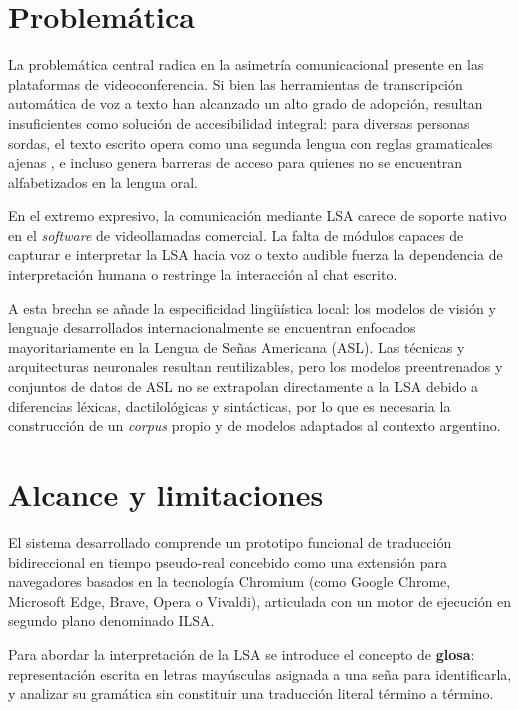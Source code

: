 \section{Problemática}
La problemática central radica en la asimetría comunicacional presente en las plataformas de videoconferencia. Si bien las herramientas de transcripción automática de voz a texto han alcanzado un alto grado de adopción, resultan insuficientes como solución de accesibilidad integral: para diversas personas sordas, el texto escrito opera como una segunda lengua con reglas gramaticales ajenas \parencite{massone2003lengua}, e incluso genera barreras de acceso para quienes no se encuentran alfabetizados en la lengua oral.

En el extremo expresivo, la comunicación mediante LSA carece de soporte nativo en el \textit{software} de videollamadas comercial. La falta de módulos capaces de capturar e interpretar la LSA hacia voz o texto audible fuerza la dependencia de interpretación humana o restringe la interacción al chat escrito.

A esta brecha se añade la especificidad lingüística local: los modelos de visión y lenguaje desarrollados internacionalmente se encuentran enfocados mayoritariamente en la Lengua de Señas Americana (ASL). Las técnicas y arquitecturas neuronales resultan reutilizables, pero los modelos preentrenados y conjuntos de datos de ASL no se extrapolan directamente a la LSA debido a diferencias léxicas, dactilológicas y sintácticas, por lo que es necesaria la construcción de un \textit{corpus} propio y de modelos adaptados al contexto argentino.

\section{Alcance y limitaciones}
El sistema desarrollado comprende un prototipo funcional de traducción bidireccional en tiempo pseudo-real concebido como una extensión para navegadores basados en la tecnología Chromium (como Google Chrome, Microsoft Edge, Brave, Opera o Vivaldi), articulada con un motor de ejecución en segundo plano denominado ILSA.

Para abordar la interpretación de la LSA se introduce el concepto de \textbf{glosa}: representación escrita en letras mayúsculas asignada a una seña para identificarla, y analizar su gramática sin constituir una traducción literal término a término.

